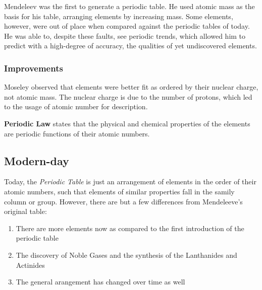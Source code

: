 Mendeleev was the first to generate a periodic table.  He used atomic mass as
the basis for his table, arranging elements by increasing mass.  Some elements,
however, were out of place when compared against the periodic tables of today.
He was able to, despite these faults, see periodic trends, which allowed him to
predict with a high-degree of accuracy, the qualities of yet undiscovered
elements.

\subsubsection{Improvements}
Moseley observed that elements were better fit as ordered by their nuclear
charge, not atomic mass.  The nuclear charge is due to the number of protons,
which led to the usage of atomic number for description.

\textbf{Periodic Law} states that the physical and chemical properties of the
elements are periodic functions of their atomic numbers.

\subsection{Modern-day}
Today, the \textit{Periodic Table} is just an arrangement of elements in the
order of their atomic numbers, such that elements of similar properties fall in
the samily column or group.  However, there are but a few differences from
Mendeleeve's original table:

\begin{enumerate}
  \item There are more elements now as compared to the first introduction of the
    periodic table
  \item The discovery of Noble Gases and the synthesis of the Lanthanides and
    Actinides
  \item The general arangement has changed over time as well
\end{enumerate}
